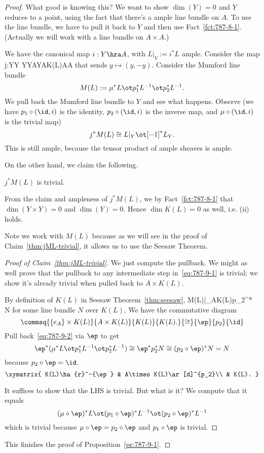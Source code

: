 \begin{proof}
What good is knowing this? We want to show $\dim(Y)=0$ and $Y$ reduces to a point, using the fact that there's a ample line bundle on $A$. To use the line bundle, we have to pull it back to $Y$ and then use  Fact~\ref{fct:787-8-1}. (Actually we will work with a line bundle on $A\times A$.)

We have the canonical map $i:Y\hra A$, with $L|_Y:=i^*L$ ample. Consider the map 
j:Y\times Y Y\times Y\subeq A\times Y\subeq A\times K(L)\subeq A\times A\eeq
that sends $y\mapsto (y,-y)$. Consider the Mumford line bundle
\[
M(L):=\mu^*L\ot p_1^*L^{-1}\ot p_2^* L^{-1}.
\]
We pull back the Mumford line bundle to $Y$ and see what happens. Observe (we have $p_1\circ (\id,i)$ is the identity, $p_2\circ (\id,i)$ is the inverse map, and $\mu\circ (\id,i)$ is the trivial map)
\[
j^*M(L)\cong L|_Y\ot [-1]^*L_Y.
\]
This is still ample, because the tensor product of ample sheaves is ample.

On the other hand, we claim the following.
\begin{clm}
$j^*M(L)$ is trivial.
\end{clm}
From the claim and ampleness of $j^*M(L)$, we by Fact~\ref{fct:787-8-1} that $\dim(Y\times Y)=0$ and $\dim(Y)=0$. Hence $\dim K(L)=0$ as well, i.e. (ii) holds.

Note we work with $M(L)$ because as we will see in the proof of Claim~\ref{thm:jML-trivial}, it allows us to use the Seesaw Theorem.

\begin{proof}[Proof of Claim~\ref{thm:jML-trivial}]
We just compute the pullback.
We might as well prove that the pullback to any intermediate step in~\eqref{eq:787-9-1} is trivial; we show it's already trivial when pulled back to $A\times K(L)$.

By definition of $K(L)$ in Seesaw Theorem~\ref{thm:seesaw}, 
M(L)|_{A\times K(L)}\cong p_2^* N %
\eeq
for some line bundle $N$ over $K(L)$. We have the commutative diagram
\[
\commsq{\{e_A\}\times K(L)}{A\times K(L)}{K(L)}{K(L).}{\cong}{\ep}{p_2}{\id}
\]
Pull back~\eqref{eq:787-9-2} via $\ep$ to get
\[
\ep^* (\mu^*L\ot p_1^* L^{-1}\ot p_2^*L^{-1})\cong \ep^* p_2^* N\cong (p_2\circ \ep)^*N=N
\]
because $p_2\circ \ep=\id$.
\[
\xymatrix{
K(L)\ha{r}^-{\ep} & A\times K(L)\ar[d]^{p_2}\\
& K(L).
}
\]

It suffices to show that the LHS is trivial. But what is it? We compute that it equals
\[
(\mu\circ \ep)^*L\ot (p_1\circ \ep)^*L^{-1} \ot (p_2\circ \ep)^*L^{-1}
\]
which is trivial because $\mu\circ \ep=p_2\circ \ep$ and $p_1\circ \ep$ is trivial. %
\end{proof}
This finishes the proof of Proposition~\ref{pr:787-9-1}.
\end{proof}
